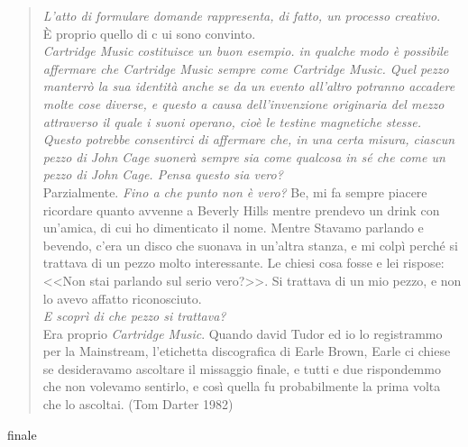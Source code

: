 \begin{quote}
	\emph{L'atto di formulare domande rappresenta, di fatto, un processo creativo}.\\
	È proprio quello di c ui sono convinto.\\
	\emph{\emph{Cartridge Music} costituisce un buon esempio. in qualche modo è possibile affermare che \emph{Cartridge Music} sempre come \emph{Cartridge Music}. Quel pezzo manterrò la sua identità anche se da un evento all'altro potranno accadere molte cose diverse, e questo a causa dell'invenzione originaria del mezzo attraverso il quale i suoni operano, cioè le testine magnetiche stesse. Questo potrebbe consentirci di affermare che, in una certa misura, ciascun pezzo di John Cage suonerà sempre sia come qualcosa in sé che come un pezzo di John Cage. Pensa questo sia vero?} \\
	Parzialmente.
	\emph{Fino a che punto non è vero?}
	Be, mi fa sempre piacere ricordare quanto avvenne a Beverly Hills mentre prendevo un drink con un'amica, di cui ho dimenticato il nome. Mentre Stavamo parlando e bevendo, c'era un disco che suonava in un'altra stanza, e mi colpì perché si trattava di un pezzo molto interessante. Le chiesi cosa fosse e lei rispose: <<Non stai parlando sul serio vero?>>. Si trattava di un mio pezzo, e non lo avevo affatto riconosciuto.\\
	\emph{E scoprì di che pezzo si trattava?}\\
	Era proprio \emph{Cartridge Music}. Quando david Tudor ed io lo registrammo per la Mainstream, l'etichetta discografica di Earle Brown, Earle ci chiese se desideravamo ascoltare il missaggio finale, e tutti e due rispondemmo che non volevamo sentirlo, e così quella fu probabilmente la prima volta che lo ascoltai. (Tom Darter 1982)

\end{quote}

finale

